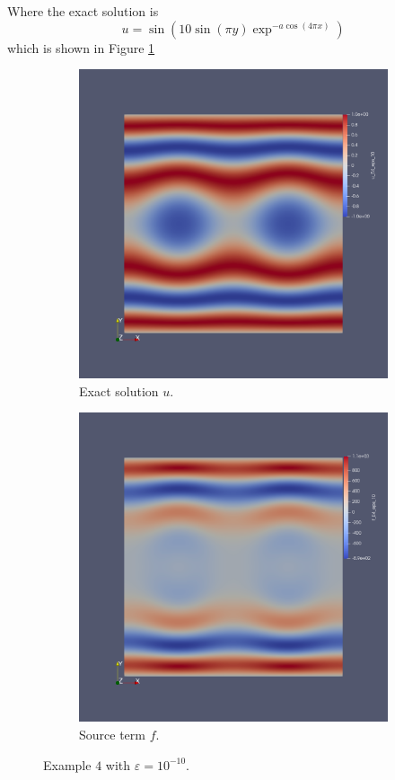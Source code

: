 \documentclass[12pt]{ociamthesis}
\begin{document}
Where the exact solution is 
\begin{equation}
u = \sin(10 \sin(\pi y) \exp^{-a\cos(4 \pi x)}) 
\end{equation}
which is shown in Figure \ref{E4_uf}

\begin{figure}[H]
 \begin{subfigure}{0.5\textwidth}
     \includegraphics[width=\textwidth]{Pics/uf/U_E4_eps_10.png}
     \caption{Exact solution $u$.}
 \end{subfigure}
   \begin{subfigure}{0.5\textwidth}
     \includegraphics[width=\textwidth]{Pics/uf/F_E4_eps_10.png}
     \caption{Source term $f$.}
 \end{subfigure}
 \caption{Example $4$ with $\varepsilon = 10^{-10}$.} \label{E4_uf}
\end{figure}
\end{document}

